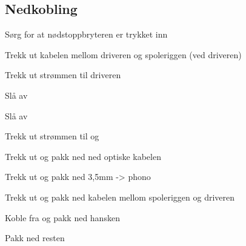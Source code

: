 \subsection{Nedkobling}
\begin{todolist}
    \item{Sørg for at nødstoppbryteren er trykket inn}
    \item{Trekk ut kabelen mellom driveren og spoleriggen (ved driveren)}
    \item{Trekk ut strømmen til driveren}
    \item{Slå av \pulsformer}
    \item{Slå av \signalkilde}
    \item{Trekk ut strømmen til \pulsformer og \signalkilde}
    \item{Trekk ut og pakk ned ned optiske kabelen}
    \item{Trekk ut og pakk ned 3,5mm -> phono}
    \item{Trekk ut og pakk ned kabelen mellom spoleriggen og driveren}
    \item{Koble fra og pakk ned hansken}
    \item{Pakk ned resten}
\end{todolist}